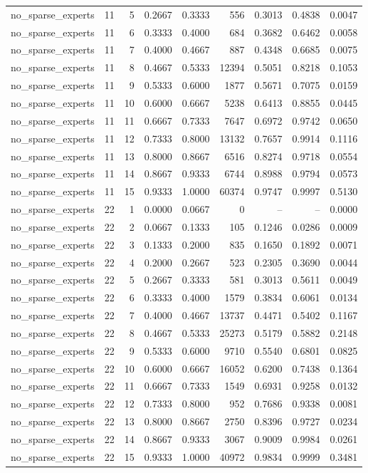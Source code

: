 \begin{tabular}{lrrrrrrrr}
no\_sparse\_experts & 11 & 5 & 0.2667 & 0.3333 & 556 & 0.3013 & 0.4838 & 0.0047 \\
no\_sparse\_experts & 11 & 6 & 0.3333 & 0.4000 & 684 & 0.3682 & 0.6462 & 0.0058 \\
no\_sparse\_experts & 11 & 7 & 0.4000 & 0.4667 & 887 & 0.4348 & 0.6685 & 0.0075 \\
no\_sparse\_experts & 11 & 8 & 0.4667 & 0.5333 & 12394 & 0.5051 & 0.8218 & 0.1053 \\
no\_sparse\_experts & 11 & 9 & 0.5333 & 0.6000 & 1877 & 0.5671 & 0.7075 & 0.0159 \\
no\_sparse\_experts & 11 & 10 & 0.6000 & 0.6667 & 5238 & 0.6413 & 0.8855 & 0.0445 \\
no\_sparse\_experts & 11 & 11 & 0.6667 & 0.7333 & 7647 & 0.6972 & 0.9742 & 0.0650 \\
no\_sparse\_experts & 11 & 12 & 0.7333 & 0.8000 & 13132 & 0.7657 & 0.9914 & 0.1116 \\
no\_sparse\_experts & 11 & 13 & 0.8000 & 0.8667 & 6516 & 0.8274 & 0.9718 & 0.0554 \\
no\_sparse\_experts & 11 & 14 & 0.8667 & 0.9333 & 6744 & 0.8988 & 0.9794 & 0.0573 \\
no\_sparse\_experts & 11 & 15 & 0.9333 & 1.0000 & 60374 & 0.9747 & 0.9997 & 0.5130 \\
no\_sparse\_experts & 22 & 1 & 0.0000 & 0.0667 & 0 & -- & -- & 0.0000 \\
no\_sparse\_experts & 22 & 2 & 0.0667 & 0.1333 & 105 & 0.1246 & 0.0286 & 0.0009 \\
no\_sparse\_experts & 22 & 3 & 0.1333 & 0.2000 & 835 & 0.1650 & 0.1892 & 0.0071 \\
no\_sparse\_experts & 22 & 4 & 0.2000 & 0.2667 & 523 & 0.2305 & 0.3690 & 0.0044 \\
no\_sparse\_experts & 22 & 5 & 0.2667 & 0.3333 & 581 & 0.3013 & 0.5611 & 0.0049 \\
no\_sparse\_experts & 22 & 6 & 0.3333 & 0.4000 & 1579 & 0.3834 & 0.6061 & 0.0134 \\
no\_sparse\_experts & 22 & 7 & 0.4000 & 0.4667 & 13737 & 0.4471 & 0.5402 & 0.1167 \\
no\_sparse\_experts & 22 & 8 & 0.4667 & 0.5333 & 25273 & 0.5179 & 0.5882 & 0.2148 \\
no\_sparse\_experts & 22 & 9 & 0.5333 & 0.6000 & 9710 & 0.5540 & 0.6801 & 0.0825 \\
no\_sparse\_experts & 22 & 10 & 0.6000 & 0.6667 & 16052 & 0.6200 & 0.7438 & 0.1364 \\
no\_sparse\_experts & 22 & 11 & 0.6667 & 0.7333 & 1549 & 0.6931 & 0.9258 & 0.0132 \\
no\_sparse\_experts & 22 & 12 & 0.7333 & 0.8000 & 952 & 0.7686 & 0.9338 & 0.0081 \\
no\_sparse\_experts & 22 & 13 & 0.8000 & 0.8667 & 2750 & 0.8396 & 0.9727 & 0.0234 \\
no\_sparse\_experts & 22 & 14 & 0.8667 & 0.9333 & 3067 & 0.9009 & 0.9984 & 0.0261 \\
no\_sparse\_experts & 22 & 15 & 0.9333 & 1.0000 & 40972 & 0.9834 & 0.9999 & 0.3481 \\
\bottomrule
\end{tabular}
